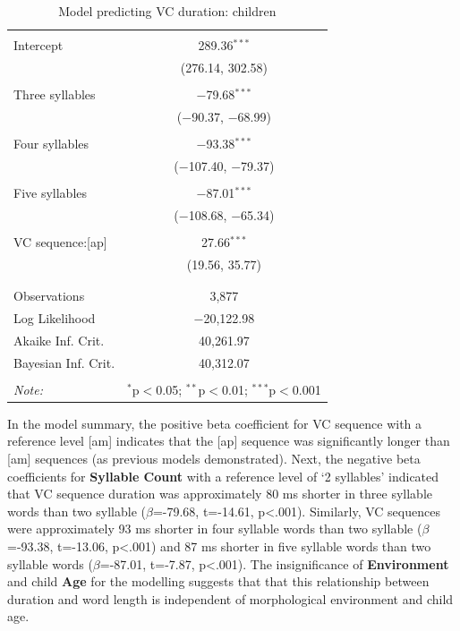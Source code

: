 \documentclass[a4paper,man,floatsintext,natbib,donotrepeattitle, apacite]{apa6}
\begin{document}
\begin{table}[!htbp] \centering 
  \caption{Model predicting VC duration: children} 
  \label{tab:dursum} 
\begin{tabular}{@{\extracolsep{5pt}}lc} 
\\[-1.8ex]\hline 
\hline \\[-1.8ex] 
 Intercept & 289.36$^{***}$ \\ 
  & (276.14, 302.58) \\ 
  & \\ 
 Three syllables & $-$79.68$^{***}$ \\ 
  & ($-$90.37, $-$68.99) \\ 
  & \\ 
 Four syllables & $-$93.38$^{***}$ \\ 
  & ($-$107.40, $-$79.37) \\ 
  & \\ 
 Five syllables & $-$87.01$^{***}$ \\ 
  & ($-$108.68, $-$65.34) \\ 
  & \\ 
 VC sequence:[ap] & 27.66$^{***}$ \\ 
  & (19.56, 35.77) \\ 
  & \\ 
\hline \\[-1.8ex] 
Observations & 3,877 \\ 
Log Likelihood & $-$20,122.98 \\ 
Akaike Inf. Crit. & 40,261.97 \\ 
Bayesian Inf. Crit. & 40,312.07 \\ 
\hline 
\hline \\[-1.8ex] 
\textit{Note:}  & \multicolumn{1}{r}{$^{*}$p$<$0.05; $^{**}$p$<$0.01; $^{***}$p$<$0.001} \\ 
\end{tabular} 
\end{table}

In the model summary, the positive beta coefficient for VC sequence with a reference level {[}am{]} indicates that the {[}ap{]} sequence was significantly longer than {[}am{]} sequences (as previous models demonstrated). Next, the negative beta coefficients for \textbf{Syllable Count} with a reference level of `2 syllables' indicated that VC sequence duration was approximately 80 ms shorter in three syllable words than two syllable (\(\beta\)=-79.68, t=-14.61, p\textless.001). Similarly, VC sequences were approximately 93 ms shorter in four syllable words than two syllable (\(\beta\)=-93.38, t=-13.06, p\textless.001) and 87 ms shorter in five syllable words than two syllable words (\(\beta\)=-87.01, t=-7.87, p\textless.001). The insignificance of \textbf{Environment} and child \textbf{Age} for the modelling suggests that that this relationship between duration and word length is independent of morphological environment and child age.
\end{document}
